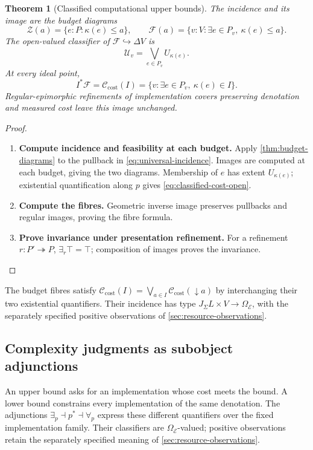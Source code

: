 \documentclass[11pt,a4paper]{article}
\numberwithin{algorithm}{section}
\numberwithin{equation}{section}
\newtheorem{theorem}{Theorem}[section]
\theoremstyle{definition}
\theoremstyle{remark}
\theoremstyle{plain}
\newcommand{\E}{\mathcal E}
\newcommand{\Truth}{\Omega_{\E}}
\newcommand{\J}{J_{\Sigma}}
\newcommand{\incl}{\hookrightarrow}
\newcommand{\onto}{\twoheadrightarrow}
\newcommand{\CostClass}{\mathcal C_{\mathrm{cost}}}
\theoremstyle{definition}
\theoremstyle{plain}
\begin{document}
\begin{theorem}[Classified computational upper bounds]
\label{thm:universal-cost}
The incidence and its image are the budget diagrams
\[
 \mathscr Z(a)=\{e:P:\kappa(e)\le a\},\qquad
 \mathscr F(a)=\{v:V:\exists e\in P_v,\ \kappa(e)\le a\}.
\]
The open-valued classifier of $\mathscr F\incl\Delta V$ is
\begin{equation}\label{eq:classified-cost-open}
 \mathcal U_v=\bigvee_{e\in P_v}U_{\kappa(e)}.
\end{equation}
At every ideal point,
\begin{equation}\label{eq:classified-cost-fibre}
 I^*\mathscr F=\CostClass(I)
 =\{v:\exists e\in P_v,\ \kappa(e)\in I\}.
\end{equation}
Regular-epimorphic refinements of implementation covers preserving
denotation and measured cost leave this image unchanged.
\end{theorem}
\begin{proof}\leavevmode
\begin{enumerate}[leftmargin=*,align=left]
\item \textbf{Compute incidence and feasibility at each budget.}
Apply \cref{thm:budget-diagrams} to the pullback in
\eqref{eq:universal-incidence}. Images are computed at each
budget, giving the two diagrams. Membership of $e$ has extent
$U_{\kappa(e)}$; existential quantification along $p$ gives
\eqref{eq:classified-cost-open}.

\item \textbf{Compute the fibres.}
Geometric inverse image preserves
pullbacks and regular images, proving the fibre formula.

\item \textbf{Prove invariance under presentation refinement.}
For a refinement $r:P'\onto P$, $\exists_r\top=\top$;
composition of images proves the invariance.
\end{enumerate}
\end{proof}

The budget fibres satisfy
$\CostClass(I)=\bigvee_{a\in I}\CostClass(\downarrow a)$
by interchanging their two existential quantifiers. Their incidence
has type $\J L\times V\to\Truth$, with the separately specified
positive observations of \cref{sec:resource-observations}.

\subsection{Complexity judgments as subobject adjunctions}
\label{sec:complexity-quantifiers}
An upper bound asks for an implementation whose cost meets the bound.
A lower bound constrains every implementation of the same denotation.
The adjunctions $\exists_p\dashv p^*\dashv\forall_p$ express these
different quantifiers over the fixed implementation family.
Their classifiers are $\Truth$-valued; positive observations retain
the separately specified meaning of \cref{sec:resource-observations}.
\end{document}
